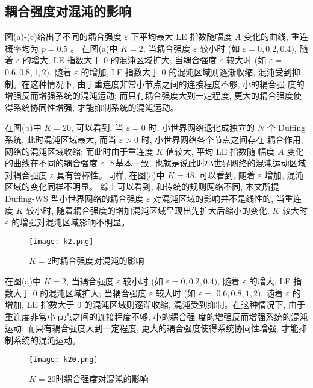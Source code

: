 \subsection{耦合强度对混沌的影响}
图(a)-(c)给出了不同的耦合强度 $\varepsilon$ 下平均最大 LE 指数随幅度 $A$ 变化的曲线, 重连概率均为 $p=0.5$ 。
在图(a)中 $K=2$, 当耦合强度 $\varepsilon$ 较小时 (如 $\varepsilon=0,0.2,0.4)$, 随着 $\varepsilon$ 的增大,
LE 指数大于 0 的混沌区域扩大; 当耦合强度 $\varepsilon$ 较大时 (如 $\varepsilon=$ $0.6,0.8,1,2)$, 
随着 $\varepsilon$ 的增加, LE 指数大于 0 的混沌区域则逐渐收缩, 混沌受到抑制。在这种情况下, 
由于重连度非常小节点之间的连接程度不够, 小的耦合强 度的增强反而增强系统的混沌运动; 而只有耦合强度大到一定程度, 
更大的耦合强度使得系统协同性增强, 才能抑制系统的混沌运动。\par
在图(b)中 $K=20$, 可以看到, 当 $\varepsilon=0$ 时, 小世界网络退化成独立的 $N$ 个 Duffing系统, 此时混沌区域最大, 
而当 $\varepsilon>0$ 时, 小世界网络各个节点之间存在 耦合作用, 网络的混沌区域收缩; 而此时由于重连度 $K$ 值较大, 平均 LE 指数随
幅度 $A$ 变化的曲线在不同的耦合强度 $\varepsilon$ 下基本一致, 也就是说此时小世界网络的混沌运动区域对耦合强度 
$\varepsilon$ 具有鲁棒性。同样, 在图(c)中 $K=48$, 可以看到, 随着 $\varepsilon$ 增加, 混沌区域的变化同样不明显。
综上可以看到, 和传统的规则网络不同, 本文所提 Duffing-WS 型小世界网络的耦合强度 $\varepsilon$ 
对混沌区域的影响并不是线性的, 当重连度 $K$ 较小时, 随着耦合强度的增加混沌区域呈现出先扩大后缩小的变化, 
$K$ 较大时 $\varepsilon$ 的增强对混沌区域影响不明显。\par
\begin{figure}[!htbp]
    \centering
    \texttt{[image: k2.png]}
    \caption{$K=2$时耦合强度对混沌的影响}
\end{figure}
在图(a)中 $K=2$, 当耦合强度 $\varepsilon$ 较小时 (如 $\varepsilon=0,0.2,0.4)$, 随着 $\varepsilon$ 的增大,
LE 指数大于 0 的混沌区域扩大; 当耦合强度 $\varepsilon$ 较大时 (如 $\varepsilon=$ $0.6,0.8,1,2)$,
随着 $\varepsilon$ 的增加, LE 指数大于 0 的混沌区域则逐渐收缩, 混沌受到抑制。在这种情况下,
由于重连度非常小节点之间的连接程度不够, 小的耦合强 度的增强反而增强系统的混沌运动; 而只有耦合强度大到一定程度,
更大的耦合强度使得系统协同性增强, 才能抑制系统的混沌运动。\par
\begin{figure}[!htbp]
    \centering
    \texttt{[image: k20.png]}
    \caption{$K=20$时耦合强度对混沌的影响}
\end{figure}

